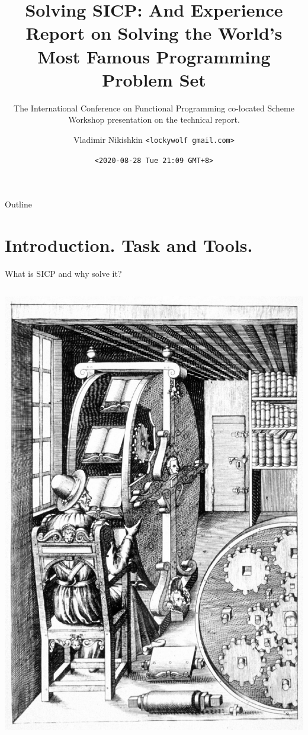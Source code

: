 \documentclass[presentation, CJK, compress]{beamer}
\author{Vladimir Nikishkin \newline \texttt{<lockywolf gmail.com>}}
\date{\texttt{<2020-08-28 Tue 21:09 GMT+8>}}
\title{Solving SICP: And Experience Report on Solving the World's Most Famous Programming Problem Set}
\subtitle{The International Conference on Functional Programming co-located Scheme Workshop presentation on the technical report.}
\begin{document}
\maketitle
\begin{frame}{Outline}
\tableofcontents
\end{frame}


\section{Introduction. Task and Tools.}
\label{sec:org5377d15}

\begin{frame}[label={sec:org26160fd}]{What is SICP and why solve it?}
\begin{columns}
\begin{column}{0.45\columnwidth}
\begin{center}
\includegraphics[width=.9\linewidth]{bookwheel.jpg}
\end{center}
\end{column}


\end{columns}
\end{frame}
\end{document}

